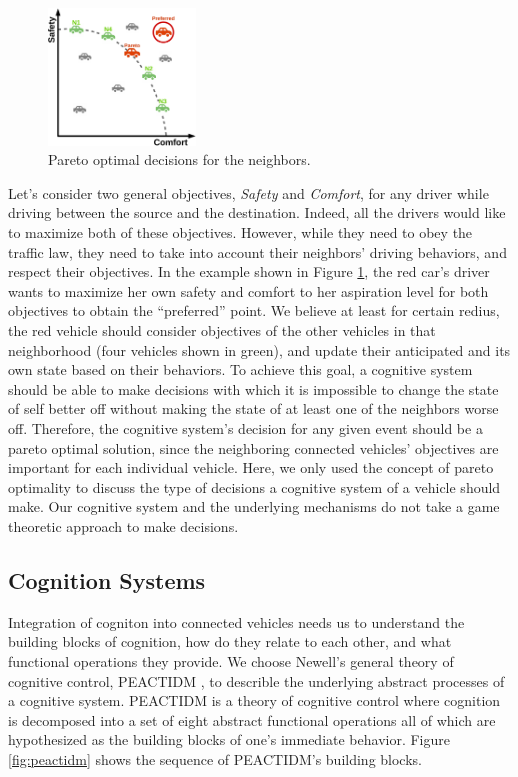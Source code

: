 \documentclass[journal, 11pt]{IEEEtran}
\begin{document}
\begin{figure}[tbh]
  \centering
  \includegraphics[width=0.35\textwidth]{figs/pareto-croped.pdf}
  \caption{{\fontsize{10}{10}\selectfont Pareto optimal decisions for the
  neighbors.}}
  \label{fig:pareto}
\end{figure}

Let's consider two general objectives, \textit{Safety} and \textit{Comfort}, for
any driver while driving between the source and the destination. Indeed, all the
drivers would like to maximize both of these objectives. However, while they
need to obey the traffic law, they need to take into account their neighbors'
driving behaviors, and respect their objectives. In the example shown in Figure
\ref{fig:pareto}, the red car's driver wants to maximize her own safety and
comfort to her aspiration level for both objectives to obtain the ``preferred''
point. We believe at least for certain redius, the red vehicle should consider
objectives of the other vehicles in that neighborhood (four vehicles shown in
green), and update their anticipated and its own state based on their behaviors.
To achieve this goal, a cognitive system should be able to make decisions with
which it is impossible to change the state of self better off without making the
state of at least one of the neighbors worse off. Therefore, the cognitive
system's decision for any given event should be a pareto optimal solution, since
the neighboring connected vehicles' objectives are important for each individual
vehicle. Here, we only used the concept of pareto optimality to discuss the type
of decisions a cognitive system of a vehicle should make. Our cognitive system
and the underlying mechanisms do not take a game theoretic approach to make
decisions.

\subsection{Cognition Systems}

Integration of cogniton into connected vehicles needs us to understand the
building blocks of cognition, how do they relate to each other, and what
functional operations they provide. We choose Newell's general theory of
cognitive control, PEACTIDM \cite{newell:unified-cognition}, to describle the
underlying abstract processes of a cognitive system. PEACTIDM is a theory of
cognitive control where cognition is decomposed into a set of eight abstract
functional operations \cite{newell:unified-cognition} all of which are
hypothesized as the building blocks of one's immediate behavior. Figure
\ref{fig:peactidm} shows the sequence of PEACTIDM's building blocks.
\end{document}

